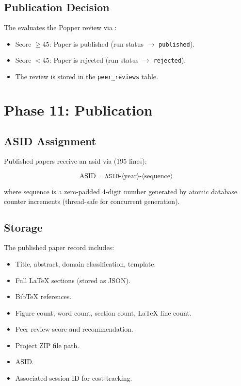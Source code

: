 \subsection{Publication Decision}

The \governor evaluates the Popper review via :

\begin{itemize}
  \item Score $\geq 45$: Paper is published (run status $\to$ \texttt{published}).
  \item Score $< 45$: Paper is rejected (run status $\to$ \texttt{rejected}).
  \item The review is stored in the \texttt{peer\_reviews} table.
\end{itemize}

\section{Phase 11: Publication}
\label{sec:pipeline:publication}

\subsection{ASID Assignment}

Published papers receive an \gls{asid} via  (195 lines):

\begin{equation}
\text{ASID} = \texttt{ASID-}\langle\text{year}\rangle\texttt{-}\langle\text{sequence}\rangle
\end{equation}

where sequence is a zero-padded 4-digit number generated by atomic database counter increments (thread-safe for concurrent generation).

\subsection{Storage}

The published paper record includes:
\begin{itemize}
  \item Title, abstract, domain classification, template.
  \item Full \LaTeX{} sections (stored as JSON).
  \item BibTeX references.
  \item Figure count, word count, section count, \LaTeX{} line count.
  \item Peer review score and recommendation.
  \item Project ZIP file path.
  \item ASID.
  \item Associated session ID for cost tracking.
\end{itemize}

